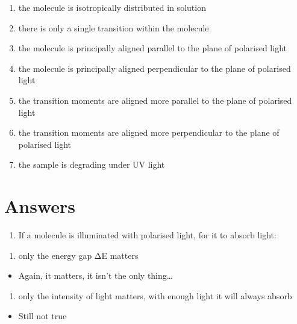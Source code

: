\documentclass[
]{book}
\providecommand{\tightlist}{%
  \setlength{\itemsep}{0pt}\setlength{\parskip}{0pt}}
\begin{document}
\begin{enumerate}
\def\labelenumi{\alph{enumi}.}
\tightlist
\item
  the molecule is isotropically distributed in solution
\item
  there is only a single transition within the molecule
\item
  the molecule is principally aligned parallel to the plane of polarised light
\item
  the molecule is principally aligned perpendicular to the plane of polarised light
\item
  the transition moments are aligned more parallel to the plane of polarised light
\item
  the transition moments are aligned more perpendicular to the plane of polarised light
\item
  the sample is degrading under UV light
\end{enumerate}

\hypertarget{answers}{%
\section{Answers}\label{answers}}

\begin{enumerate}
\def\labelenumi{\arabic{enumi}.}
\tightlist
\item
  If a molecule is illuminated with polarised light, for it to absorb light:
\end{enumerate}

\begin{enumerate}
\def\labelenumi{\alph{enumi}.}
\tightlist
\item
  only the energy gap ΔE matters
\end{enumerate}

\begin{itemize}
\tightlist
\item
  Again, it matters, it isn't the only thing\ldots{}
\end{itemize}

\begin{enumerate}
\def\labelenumi{\alph{enumi}.}
\setcounter{enumi}{1}
\tightlist
\item
  only the intensity of light matters, with enough light it will always absorb
\end{enumerate}

\begin{itemize}
\tightlist
\item
  Still not true
\end{itemize}
\end{document}
